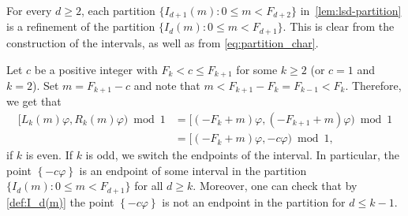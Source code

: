 \documentclass[12pt,runningheads]{llncs}
\renewcommand{\phi}{\varphi}
\newcommand{\fract}[1]{\left\{ #1 \right\}}
\begin{document}
\begin{remark}\label{rem:partition}
For every $d\geq 2$, each partition $\{I_{d+1}(m)\colon 0\leq m < F_{d+2}\}$ in~\cref{lem:lsd-partition} is a refinement of the partition $\{I_{d}(m)\colon 0\leq m < F_{d+1}\}$. This is clear from the construction of the intervals, as well as from \eqref{eq:partition_char}.
\end{remark}

\begin{remark}\label{rem:c_in_partition}
Let $c$ be a positive integer with $F_{k} < c \leq F_{k+1}$ for some $k\geq 2$ (or $c = 1$ and $k=2$). 
Set $m = F_{k+1} - c$ and note that $m < F_{k+1} - F_{k} = F_{k-1} < F_{k}$. Therefore,
we get that
\begin{align*}
    [L_{k}(m)\phi, R_{k}(m)\phi) \bmod 1 
    &= [ (- F_{k} + m)\phi, (-F_{k+1} + m)\phi )\bmod 1 \\
    &= [(-F_{k} + m)\phi, - c\phi ) \bmod 1,
\end{align*}
if $k$ is even. If $k$ is odd, we switch the endpoints of the interval.
In particular, the point $\fract{-c\phi}$ is an endpoint of some interval in the partition $\{I_{d}(m)\colon 0\leq m < F_{d+1}\}$ for all $d\geq k$. 
Moreover, one can check that by \cref{def:I_d(m)} the point $\fract{-c\phi}$ is not an endpoint in the partition for $d\leq k-1$.
\end{remark}
\end{document}
